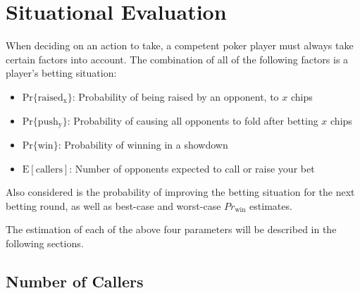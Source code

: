 
\clearpage




\chapter{Situational Evaluation}
\label{sec:SituationalEvaluation}

When deciding on an action to take, a competent poker player must always take certain factors into account.
The combination of all of the following factors is a player's betting situation:
\begin{itemize}
\singlespacing
\item $\mathrm{Pr\{raised_x\}}$: Probability of being raised by an opponent, to $x$ chips
\item $\mathrm{Pr\{push_y\}}$: Probability of causing all opponents to fold after betting $x$ chips
\item $\mathrm{Pr\{win\}}$: Probability of winning in a showdown
\item $\mathrm{E[callers]}$: Number of opponents expected to call or raise your bet
\end{itemize}
Also considered is the probability of improving the betting situation for the next betting round, as well as best-case and worst-case $Pr_\mathrm{win}$ estimates.

The estimation of each of the above four parameters will be described in the following sections.



\section{Number of Callers}
\label{sec:Callers}






\clearpage
